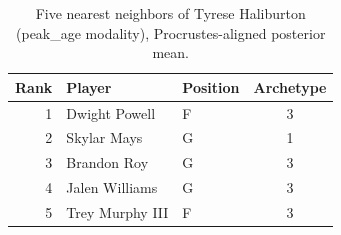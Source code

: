 \begin{table}[htbp]
  \centering\small
  \begin{tabular}{rllc}
    \toprule
    Rank & Player & Position & Archetype \\
    \midrule
    1 & Dwight Powell & F & 3 \\
    2 & Skylar Mays & G & 1 \\
    3 & Brandon Roy & G & 3 \\
    4 & Jalen Williams & G & 3 \\
    5 & Trey Murphy III & F & 3 \\
    \bottomrule
  \end{tabular}
  \caption{Five nearest neighbors of Tyrese Haliburton (peak_age modality), Procrustes-aligned posterior mean.}
  \label{tab:Tyrese_Haliburton_neighbors_peak_age}
\end{table}

